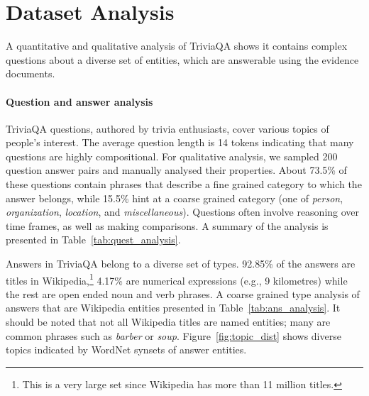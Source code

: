 \section{Dataset Analysis}
\label{sec:dataset_analysis}

A quantitative and qualitative analysis of TriviaQA shows it contains complex questions about a diverse set of entities, which are answerable using the evidence documents. 

\paragraph{Question and answer analysis} TriviaQA questions, authored by trivia enthusiasts, cover various topics of people's interest. The average question length is 14 tokens indicating that many questions are highly compositional. For qualitative analysis, we sampled 200 question answer pairs and manually analysed their properties. About 73.5\% of these questions contain phrases that describe a fine grained category to which the answer belongs, while 15.5\% hint at a coarse grained category (one of \emph{person}, \emph{organization}, \emph{location}, and \emph{miscellaneous}). Questions often involve reasoning over time frames, as well as making comparisons. A summary of the analysis is presented in Table~\ref{tab:quest_analysis}. 

Answers in TriviaQA belong to a diverse set of types. 92.85\% of the answers are titles in Wikipedia,\footnote{This is a very large set since Wikipedia has more than 11 million titles.} 4.17\% are numerical expressions (e.g., 9 kilometres) while the rest are open ended noun and verb phrases. A coarse grained type analysis of answers that are Wikipedia entities presented in Table~\ref{tab:ans_analysis}. It should be noted that not all Wikipedia titles are named entities; many are common phrases such as \emph{barber}  or \emph{soup}. Figure~\ref{fig:topic_dist} shows diverse topics indicated by WordNet synsets of answer entities. 

